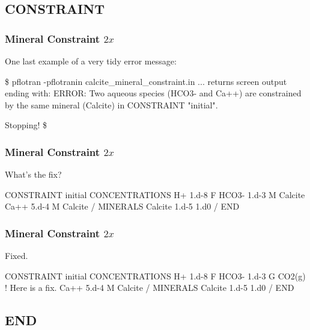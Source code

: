 \documentclass{beamer}
\newcommand\gehcomment[1]{{{\color{orange} #1}}}
\newcommand\redcomment[1]{{{\color{red} #1}}}
\newcommand\bluecomment[1]{{{\color{blue} #1}}}
\begin{document}
\subsection{CONSTRAINT}

\begin{frame}\frametitle{Mineral Constraint ${2x}$}
One last example of a very tidy error message:
\begin{semiverbatim}

\$ pflotran -pflotranin calcite_mineral_constraint.in
... \gehcomment{returns screen output ending with:}
  ERROR: Two aqueous species (HCO3- and Ca++) are
  constrained by the same mineral (Calcite) in 
  CONSTRAINT "initial".

  Stopping!
\$
\end{semiverbatim}

\end{frame}

\begin{frame}\frametitle{Mineral Constraint ${2x}$}
\redcomment{What's the fix?}
\begin{semiverbatim}

CONSTRAINT initial
  CONCENTRATIONS
    H+     1.d-8      F
    HCO3-  1.d-3      M  Calcite
    Ca++   5.d-4      M  Calcite
  /
  MINERALS
    Calcite 1.d-5 1.d0
  /
END
\end{semiverbatim}

\end{frame}

\begin{frame}\frametitle{Mineral Constraint ${2x}$}

\redcomment{Fixed.}
\begin{semiverbatim}

CONSTRAINT initial
  CONCENTRATIONS
    H+     1.d-8      F
    HCO3-  1.d-3      G  CO2(g) \bluecomment{! Here is a fix.}
    Ca++   5.d-4      M  Calcite
  /
  MINERALS
    Calcite 1.d-5 1.d0
  /
END
\end{semiverbatim}

\end{frame}

\subsection{END}
\end{document}
